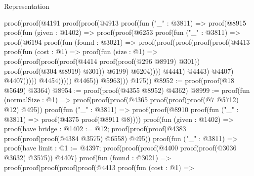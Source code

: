 \begin{lexlean}{Representation}
\begin{coremodule}
              proof(proof(@4191
                    proof(proof(@4913
                          proof(fun ("_" : @3811) =>
                            proof(@8915
                                proof(fun (given : @1402) =>
                                  proof(proof(@6253
                                        proof(fun ("_" : @3811) =>
                                          proof(@6194
                                              proof(fun (found : @3021) =>
                                                proof(proof(proof(proof(proof(@4413
                                                            proof(fun (cost : @1) =>
                                                              proof(fun (size : @1) =>
                                                                proof(proof(proof(proof(@4414
                                                                          proof(proof(@296 @8919)
                                                                              @301))
                                                                        proof(proof(@304 @8919)
                                                                            @301))
                                                                      @6199)
                                                                    @6204))))
                                                          @4441)
                                                        @4443)
                                                      @4407)
                                                    @4407)))))
                                      @4454)))))
                        @4465))
                  @5963)))
          @175))
@8952 := proof(proof(@18 @5649) @3364)
@8954 := proof(proof(@4355 @8952) @4362)
@8999 := proof(fun (normalSize : @1) =>
    proof(proof(proof(@4365 proof(proof(proof(@7 @5712) @12) @495))
          proof(fun ("_" : @3811) =>
            proof(proof(@8910 proof(fun ("_" : @3811) => proof(@4375 proof(@8911 @8))))
                proof(fun (given : @1402) =>
                  proof(have bridge : @1402 := @12;
                    proof(proof(proof(@4383 proof(proof(proof(@4384 @3575) @6558) @495))
                          proof(fun ("_" : @3811) =>
                            proof(have limit : @1 := @4397;
                              proof(proof(proof(@4400 proof(proof(@3036 @3632) @3575)) @4407)
                                  proof(fun (found : @3021) =>
                                    proof(proof(proof(proof(proof(@4413
                                                proof(fun (cost : @1) =>

\end{coremodule}
\end{lexlean}
